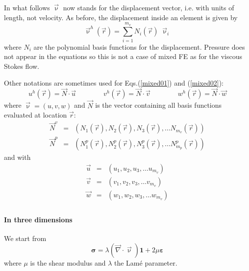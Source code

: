 
In what follows $\vec\upnu$ now stands for the displacement vector, i.e. 
with units of length, not velocity. 
As before, the displacement inside an element is given by 
\begin{equation}
{\vec \upnu}^h({\vec r})=\sum_{i=1}^{m_v} N_i({\vec r})\;  {\vec \upnu}_i
\label{mixed01}
\end{equation}
where $N_i$ are the polynomial basis functions for the displacement.
Pressure does not appear in the equations so this is not a case of 
mixed FE as for the viscous Stokes flow. 

Other notations are sometimes used for Eqs.(\ref{mixed01}) and (\ref{mixed02}):
\begin{equation}
u^h({\vec r}) = \vec{N} \cdot \vec{u}
\quad\quad\quad\quad
v^h({\vec r}) = \vec{N} \cdot \vec{v}
\quad\quad\quad\quad
w^h({\vec r}) = \vec{N} \cdot \vec{w}
\end{equation} 
where ${\vec \upnu}=(u,v,w)$ and $\vec{N}$ 
is the vector containing all basis functions evaluated at location ${\vec r}$:
\begin{eqnarray}
\vec{N}^v &=& \left( N_1({\vec r}),  N_2({\vec r}),  N_3({\vec r}), \dots  N_{m_v}({\vec r}) \right) \\
\vec{N}^p &=& \left( N_1^p({\vec r}),  N_2^p({\vec r}),  N_3^p({\vec r}), \dots  N_{m_p}^p({\vec r}) \right)
\end{eqnarray}
and with 
\begin{eqnarray}
\vec{u} &=& \left( u_1,  u_2,  u_3, \dots  u_{m_v} \right) \\
\vec{v} &=& \left( v_1,  v_2,  v_3, \dots  v_{m_v} \right) \\
\vec{w} &=& \left( w_1,  w_2,  w_3, \dots  w_{m_v} \right) \\
\end{eqnarray}

\paragraph{In three dimensions} We start from
\[
{\bm \sigma} = \lambda (\vec\nabla\cdot \vec\upnu) {\bm 1}+ 2\mu {\bm \varepsilon}
\]
where $\mu$ is the shear modulus and $\lambda$ the Lam{\'e} parameter.

